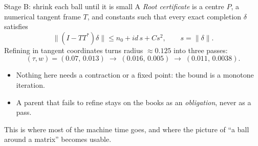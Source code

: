\documentclass[aspectratio=169,10pt]{beamer}
\begin{document}
\begin{frame}{Stage B: shrink each ball until it is small}
  \small
  A \emph{Root certificate} is a centre $P$, a numerical tangent frame $T$, and constants such that
  every exact completion $\delta$ satisfies
  \[
    \|(I-TT^{*})\delta\|\le n_0+id\,s+Cs^2,\qquad s=\|\delta\| .
  \]
  Refining in tangent coordinates turns radius $\approx0.125$ into three passes:
  \[
    (\tau,w)=(0.07,\,0.013)\;\longrightarrow\;(0.016,\,0.005)\;\longrightarrow\;(0.011,\,0.0038).
  \]
  \medskip
  \begin{itemize}
    \item Nothing here needs a contraction or a fixed point: the bound is a monotone iteration.
    \item A parent that fails to refine stays on the books as an \emph{obligation}, never as a pass.
  \end{itemize}
  \vspace{2mm}
  {\color{ink!70}This is where most of the machine time goes, and where the picture of ``a ball around a matrix'' becomes usable.}
\end{frame}
\end{document}
